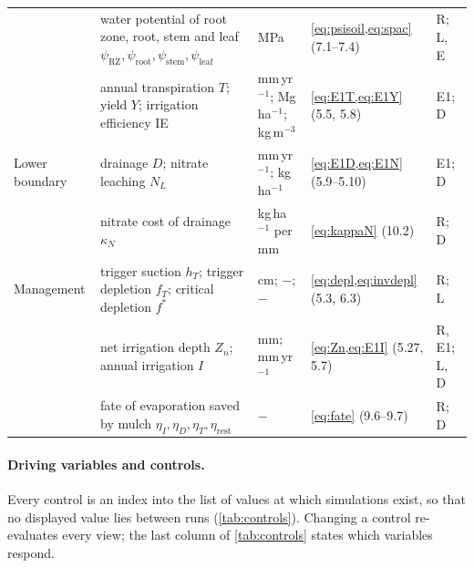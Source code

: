 {\begin{longtable}{>{\raggedright\arraybackslash}p{2.3cm}>{\raggedright\arraybackslash}p{3.8cm}>{\raggedright\arraybackslash}p{1.8cm}>{\raggedright\arraybackslash}p{4.0cm}>{\raggedright\arraybackslash}p{1.9cm}}
 & water potential of root zone, root, stem and leaf $\psi_{\mathrm{RZ}},\psi_{\mathrm{root}},\psi_{\mathrm{stem}},\psi_{\mathrm{leaf}}$ & MPa & \cref{eq:psisoil,eq:spac} (7.1--7.4) & R; L, E\\
 & annual transpiration $T$; yield $Y$; irrigation efficiency IE & mm\,yr$^{-1}$; Mg\,ha$^{-1}$; kg\,m$^{-3}$ & \cref{eq:E1T,eq:E1Y} (5.5, 5.8) & E1; D\\
Lower boundary & drainage $D$; nitrate leaching $N_L$ & mm\,yr$^{-1}$; kg\,ha$^{-1}$ & \cref{eq:E1D,eq:E1N} (5.9--5.10) & E1; D\\
 & nitrate cost of drainage $\kappa_N$ & kg\,ha$^{-1}$ per mm & \cref{eq:kappaN} (10.2) & R; D\\
Management & trigger suction $h_T$; trigger depletion $f_T$; critical depletion $f^\ast$ & cm; $-$; $-$ & \cref{eq:depl,eq:invdepl} (5.3, 6.3) & R; L\\
 & net irrigation depth $Z_n$; annual irrigation $I$ & mm; mm\,yr$^{-1}$ & \cref{eq:Zn,eq:E1I} (5.27, 5.7) & R, E1; L, D\\
 & fate of evaporation saved by mulch $\eta_I,\eta_D,\eta_T,\eta_{\mathrm{rest}}$ & $-$ & \cref{eq:fate} (9.6--9.7) & R; D\\\bottomrule
\end{longtable}}

\paragraph{Driving variables and controls.}
\label{sec:sys-controls}
Every control is an index into the list of values at which simulations exist, so that no displayed value lies between runs (\cref{tab:controls}). Changing a control re-evaluates every view; the last column of \cref{tab:controls} states which variables respond.

